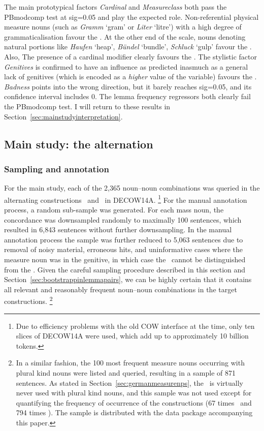 The main prototypical factors \textit{Cardinal} and \textit{Measureclass} both pass the PBmodcomp test at sig=0.05 and play the expected role.
Non-referential physical measure nouns (such as \textit{Gramm} `gram' or \textit{Liter} `litre') with a high degree of grammaticalisation favour the \NACb.
At the other end of the scale, nouns denoting natural portions like \textit{Haufen} `heap', \textit{Bündel} `bundle', \textit{Schluck} `gulp' favour the \PGCd.
Also, The presence of a cardinal modifier clearly favours the \NACb.
The stylistic factor \textit{Genitives} is confirmed to have an influence as predicted inasmuch as a general lack of genitives (which is encoded as a \textit{higher} value of the variable) favours the \NACb.
\textit{Badness} points into the wrong direction, but it barely reaches sig=0.05, and its confidence interval includes 0.
The lemma frequency regressors both clearly fail the PBmodcomp test.
I will return to these results in Section~\ref{sec:mainstudyinterpretation}.

\subsection{Main study: the alternation}
\label{sec:annotation}
\label{sec:corpushierarchicalmodel}

\subsubsection{Sampling and annotation}
\label{sec:mainstudysampling}

For the main study, each of the 2,365 noun–noun combinations was queried in the alternating constructions \PGCa\ and \NACa\ in DECOW14A.%
\footnote{Due to efficiency problems with the old COW interface at the time, only ten slices of DECOW14A were used, which add up to approximately 10 billion tokens.}
For the manual annotation process, a random sub-sample was generated.
For each mass noun, the concordance was downsampled randomly to maximally 100 sentences, which resulted in 6,843 sentences without further downsampling.
In the manual annotation process the sample was further reduced to 5,063 sentences due to removal of noisy material, erroneous hits, and uninformative cases where the measure noun was in the genitive, in which case the \NACa\ cannot be distinguished from the \PGCa.
Given the careful sampling procedure described in this section and Section~\ref{sec:bootstrappinlemmapairs}, we can be highly certain that it contains all relevant and reasonably frequent noun–noun combinations in the target constructions.%
\footnote{In a similar fashion, the 100 most frequent measure nouns occurring with plural kind nouns were listed and queried, resulting in a sample of 871 sentences.
As stated in Section~\ref{sec:germanmeasurenps}, the \NACa\ is virtually never used with plural kind nouns, and this sample was not used except for quantifying the frequency of occurrence of the constructions (67 times \NACa\ and 794 times \PGCa).
The sample is distributed with the data package accompanying this paper.}


